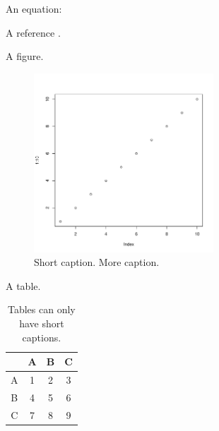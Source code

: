 \label{intro}

An equation:

A reference \citep{Tibshirani1996}.

A figure.
\begin{figure}[ht!]
 \centering
 \includegraphics[width=0.6\textwidth]{fig1}
 \caption[Short caption]{\label{fig:fig1}Short caption.  More caption.}
\end{figure}

A table.
\begin{table}[ht!]
 \ttabbox
 {\caption{\label{tab:tab1}Tables can only have short captions.}}
 {\begin{tabular}{cccc}
\hline
 & A & B & C \\
\hline
A & 1 & 2 & 3 \\
B & 4 & 5 & 6 \\
C & 7 & 8 & 9 \\
\hline
\end{tabular}}
\end{table}
